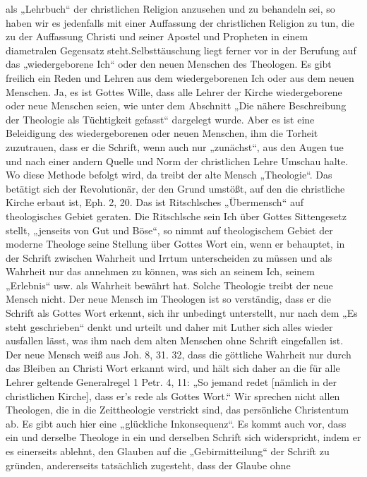als „Lehrbuch“ der christlichen Religion anzusehen und zu behandeln sei, so haben wir es jedenfalls mit einer Auffassung der christlichen Religion zu tun, die zu der Auffassung Christi und seiner Apostel und Propheten in einem diametralen Gegensatz steht.\n\nEine Selbsttäuschung liegt ferner vor in der Berufung auf das „wiedergeborene Ich“ oder den neuen Menschen des Theologen. Es gibt freilich ein Reden und Lehren aus dem wiedergeborenen Ich oder aus dem neuen Menschen. Ja, es ist Gottes Wille, dass alle Lehrer der Kirche wiedergeborene oder neue Menschen seien, wie unter dem Abschnitt „Die nähere Beschreibung der Theologie als Tüchtigkeit gefasst“ dargelegt wurde. Aber es ist eine Beleidigung des wiedergeborenen oder neuen Menschen, ihm die Torheit zuzutrauen, dass er die Schrift, wenn auch nur „zunächst“, aus den Augen tue und nach einer andern Quelle und Norm der christlichen Lehre Umschau halte. Wo diese Methode befolgt wird, da treibt der alte Mensch „Theologie“. Das betätigt sich der Revolutionär, der den Grund umstößt, auf den die christliche Kirche erbaut ist, Eph. 2, 20. Das ist Ritschlsches „Übermensch“ auf theologisches Gebiet geraten. Die Ritschlsche sein Ich über Gottes Sittengesetz stellt, „jenseits von Gut und Böse“, so nimmt auf theologischem Gebiet der moderne Theologe seine Stellung über Gottes Wort ein, wenn er behauptet, in der Schrift zwischen Wahrheit und Irrtum unterscheiden zu müssen und als Wahrheit nur das annehmen zu können, was sich an seinem Ich, seinem „Erlebnis“ usw. als Wahrheit bewährt hat. Solche Theologie treibt der neue Mensch nicht. Der neue Mensch im Theologen ist so verständig, dass er die Schrift als Gottes Wort erkennt, sich ihr unbedingt unterstellt, nur nach dem „Es steht geschrieben“ denkt und urteilt und daher mit Luther sich alles wieder ausfallen lässt, was ihm nach dem alten Menschen ohne Schrift eingefallen ist. Der neue Mensch weiß aus Joh. 8, 31. 32, dass die göttliche Wahrheit nur durch das Bleiben an Christi Wort erkannt wird, und hält sich daher an die für alle Lehrer geltende Generalregel 1 Petr. 4, 11: „So jemand redet [nämlich in der christlichen Kirche], dass er’s rede als Gottes Wort.“ Wir sprechen nicht allen Theologen, die in die Zeittheologie verstrickt sind, das persönliche Christentum ab. Es gibt auch hier eine „glückliche Inkonsequenz“. Es kommt auch vor, dass ein und derselbe Theologe in ein und derselben Schrift sich widerspricht, indem er es einerseits ablehnt, den Glauben auf die „Gebirmitteilung“ der Schrift zu gründen, andererseits tatsächlich zugesteht, dass der Glaube ohne